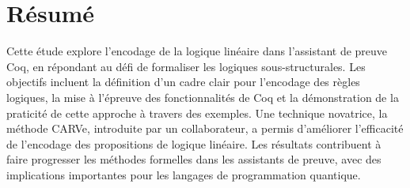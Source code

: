 %

\section*{Résumé}
\label{sec::resume}

Cette étude explore l'encodage de la logique linéaire dans l'assistant de preuve Coq, en répondant au défi de formaliser les logiques sous-structurales. Les objectifs incluent la définition d'un cadre clair pour l'encodage des règles logiques, la mise à l'épreuve des fonctionnalités de Coq et la démonstration de la praticité de cette approche à travers des exemples. Une technique novatrice, la méthode CARVe, introduite par un collaborateur, a permis d'améliorer l'efficacité de l'encodage des propositions de logique linéaire. Les résultats contribuent à faire progresser les méthodes formelles dans les assistants de preuve, avec des implications importantes pour les langages de programmation quantique.


